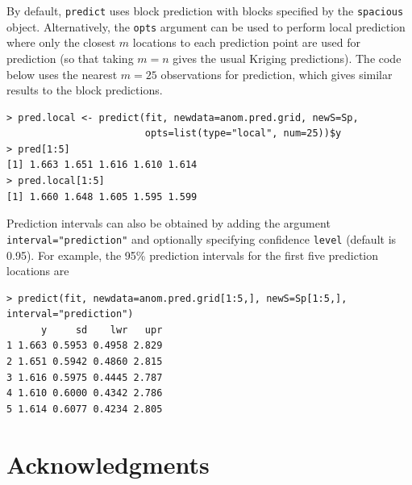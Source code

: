 \documentclass[11pt]{article}
\begin{document}
By default, {\tt predict} uses block prediction \citep{Eidsvik:2013} with blocks specified by the {\tt spacious} object.
Alternatively, the {\tt opts} argument can be used to perform local prediction where only the closest $m$ locations to each prediction point are used for prediction (so that taking $m=n$ gives the usual Kriging predictions).
The code below uses the nearest $m=25$ observations for prediction, which gives similar results to the block predictions.

\begin{verbatim}
> pred.local <- predict(fit, newdata=anom.pred.grid, newS=Sp,
                        opts=list(type="local", num=25))$y
> pred[1:5]
[1] 1.663 1.651 1.616 1.610 1.614
> pred.local[1:5]
[1] 1.660 1.648 1.605 1.595 1.599
\end{verbatim}

Prediction intervals can also be obtained by adding the argument {\tt interval="prediction"} and optionally specifying confidence {\tt level} (default is 0.95).
For example, the 95\% prediction intervals for the first five prediction locations are

\begin{verbatim}
> predict(fit, newdata=anom.pred.grid[1:5,], newS=Sp[1:5,], interval="prediction")
      y     sd    lwr   upr
1 1.663 0.5953 0.4958 2.829
2 1.651 0.5942 0.4860 2.815
3 1.616 0.5975 0.4445 2.787
4 1.610 0.6000 0.4342 2.786
5 1.614 0.6077 0.4234 2.805
\end{verbatim}

\section*{Acknowledgments}

\begin{singlespace}
	
	
\end{singlespace}
\end{document}
